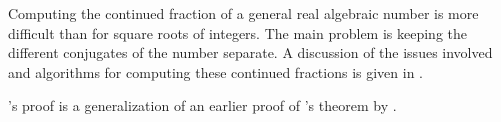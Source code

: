   Computing the continued fraction of a
general real algebraic number is more difficult than for square roots
of integers.  The main problem is keeping the different conjugates of
the number separate.  A discussion of the issues involved and
algorithms for computing these continued fractions is given in
\cite{Cantor72,Thull84}.

 {\Nathanson}'s proof is a
generalization of an earlier proof of {\Hurwitz}'s theorem by {\CohnJHE}
\cite{Cohn73}.

\normalsize


